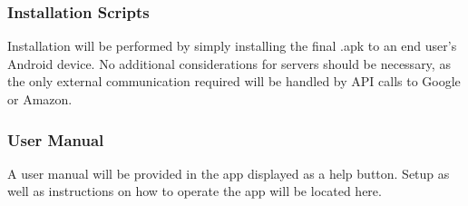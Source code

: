 \subsubsection{Installation Scripts}
Installation will be performed by simply installing the final .apk to an end user's Android device. No additional considerations for servers should be necessary, as the only external communication required will be handled by API calls to Google or Amazon.

\subsubsection{User Manual}
A user manual will be provided in the app displayed as a help button. Setup as well as instructions on how to operate the app will be located here.
